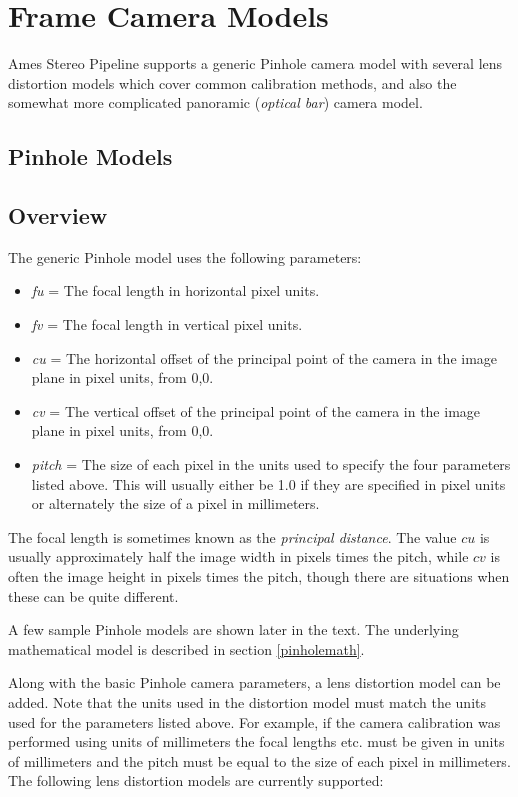 \chapter{Frame Camera Models}

Ames Stereo Pipeline supports a generic Pinhole camera model with
several lens distortion models which cover common calibration methods,
and also the somewhat more complicated panoramic (\textit{optical bar})
camera model.

\section{Pinhole Models}
\label{pinholemodels}

\section{Overview}

The generic Pinhole model uses the following parameters:

\begin{itemize}{}
\item  \textit{fu} = The focal length in horizontal pixel units.
\item  \textit{fv} = The focal length in vertical pixel units.
\item  \textit{cu} = The horizontal offset of the principal 
point of the camera in the image plane in pixel units, from 0,0.
\item  \textit{cv} = The vertical offset of the principal 
point of the camera in the image plane in pixel units, from 0,0.
\item  \textit{pitch} = The size of each pixel in the units used to specify
the four parameters listed above.  This will usually either be 1.0 if they
are specified in pixel units or alternately the size of a pixel in millimeters.
\end{itemize}

The focal length is sometimes known as the \textit{principal
distance}. The value $cu$ is usually approximately half the image width in
pixels times the pitch, while $cv$ is often the image height in pixels
times the pitch, though there are situations when these can be quite different.

A few sample Pinhole models are shown later in the text. The underlying mathematical model
is described in section \ref{pinholemath}.

Along with the basic Pinhole camera parameters, a lens distortion model
can be added.  Note that the units used in the distortion model must
match the units used for the parameters listed above.  For example, if the
camera calibration was performed using units of millimeters the focal lengths etc. must be given in
units of millimeters and the pitch must be equal to the size of each pixel in millimeters.
The following lens distortion models are currently supported:

